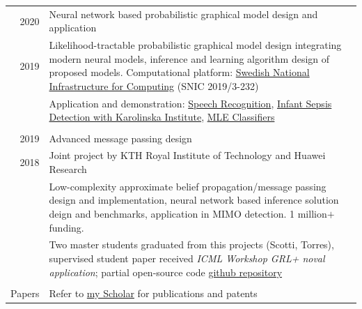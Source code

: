 \documentclass[a4paper,10pt]{article}
\begin{document}


\begin{tabular}{r|p{13cm}}
\textsc{2020} & Neural network based probabilistic graphical model design and application\\
  \textsc{2019} & Likelihood-tractable probabilistic graphical model design integrating modern neural models, inference and learning algorithm design of proposed models. Computational platform: \href{https://www.snic.se/}{Swedish National Infrastructure for Computing} (SNIC 2019/3-232)\\
              & Application and demonstration: \href{https://github.com/FirstHandScientist/genhmm}{Speech Recognition}, \href{https://arxiv.org/pdf/1910.13904.pdf}{Infant Sepsis Detection with Karolinska Institute}, \href{https://github.com/FirstHandScientist/classification-EM-GM}{MLE Classifiers}\\
     \\
  \textsc{2019}  & Advanced message passing design \\
  \textsc{2018}& Joint project by KTH Royal Institute of Technology and Huawei Research\\
              & Low-complexity approximate belief propagation/message passing design and implementation, neural network based inference solution deign and benchmarks, application in MIMO detection. 1 million$+$ funding.\\
              & Two master students graduated from this projects (Scotti, Torres), supervised student paper received \textit{ICML Workshop GRL+ noval application}; partial open-source code \href{https://github.com/FirstHandScientist/amp}{github repository} \\
   \\
             Papers & Refer to \href{https://scholar.google.com/citations?hl=en&user=eK9LoQMAAAAJ&view_op=list_works&sortby=pubdate}{my Scholar} for publications and patents
\end{tabular}
\end{document}
